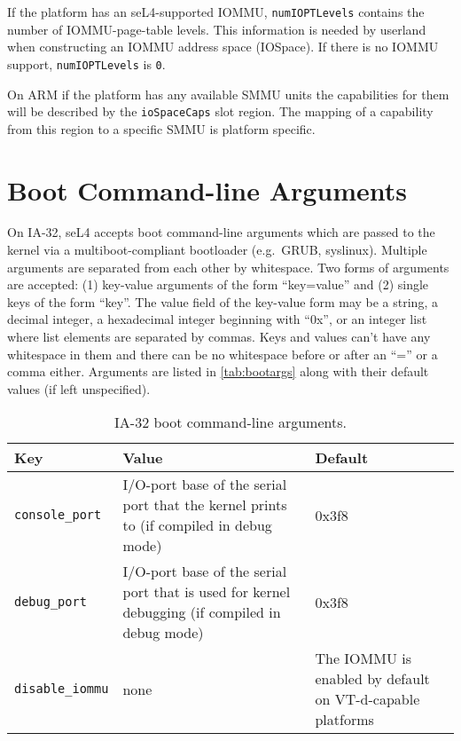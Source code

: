 If the platform has an seL4-supported IOMMU, \texttt{numIOPTLevels} contains
the number of IOMMU-page-table levels. This information is needed by userland
when constructing an IOMMU address space (IOSpace). If there is no IOMMU
support, \texttt{numIOPTLevels} is \texttt{0}.

On ARM if the platform has any available SMMU units the capabilities for them
will be described by the \texttt{ioSpaceCaps} slot region. The mapping of a
capability from this region to a specific SMMU is platform specific.

\ifxeightsix
\section{Boot Command-line Arguments}

On IA-32, seL4 accepts boot command-line arguments which are passed to the
kernel via a multiboot-compliant bootloader (e.g.\ GRUB, syslinux). Multiple
arguments are separated from each other by whitespace. Two forms of arguments
are accepted:
(1) key-value arguments of the form ``key=value'' and (2) single keys of the
form ``key''. The value field of the key-value form may be a string, a decimal
integer, a hexadecimal integer beginning with ``0x'', or an integer list where
list elements are separated by commas.
Keys and values can't have any whitespace in them and there can be no
whitespace before or after an ``='' or a comma either.
Arguments are listed in \autoref{tab:bootargs} along with their default values (if left unspecified).


\begin{table}[htb]
    \caption{IA-32 boot command-line arguments.}
        \begin{tabularx}{\textwidth}{lXX}
            \toprule
              Key & Value & Default \\
            \midrule
            \texttt{console\_port} &
            I/O-port base of the serial port that the kernel prints to
            (if compiled in debug mode) &
            0x3f8 \\
            \texttt{debug\_port} &
            I/O-port base of the serial port that is used for kernel debugging
            (if compiled in debug mode) &
            0x3f8 \\
            \texttt{disable\_iommu} &
            none &
            The IOMMU is enabled by default on VT-d-capable platforms \\
            \bottomrule
        \end{tabularx}
    \label{tab:bootargs}
\end{table}
\fi
